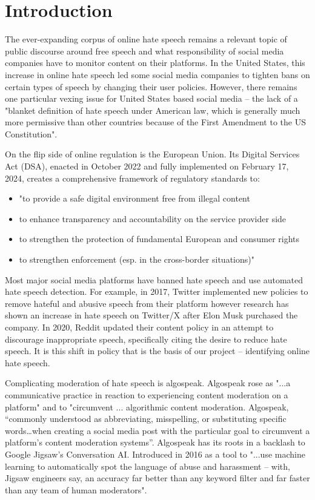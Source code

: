 \documentclass[conference]{IEEEtran}
\begin{document}
\section{Introduction}
The ever-expanding corpus of online hate speech remains a relevant topic of public discourse around free speech and what responsibility of social media companies have to monitor content on their platforms. In the United States, this increase in online hate speech led some social media companies to tighten bans on certain types of speech by changing their user policies. However, there remains one particular vexing issue for United States based social media -- the lack of a "blanket definition of hate speech under American law, which is generally much more permissive than other countries because of the First Amendment to the US Constitution"\cite{b1}. 

On the flip side of online regulation is the European Union. Its Digital Services Act (DSA), enacted in October 2022 and fully implemented on February 17, 2024, creates a comprehensive framework of regulatory standards to:
\begin{itemize}
    \item "to provide a safe digital environment free from illegal content
    \item to enhance transparency and accountability on the service provider side
    \item to strengthen the protection of fundamental European and consumer rights
    \item to strengthen enforcement (esp. in the cross-border situations)"\cite{b2}
\end{itemize}

Most major social media platforms have banned hate speech and use automated hate speech detection\cite{b3}. For example, in 2017, Twitter implemented new policies to remove hateful and abusive speech from their platform\cite{b4} however research has shown an increase in hate speech on Twitter/X after Elon Musk purchased the company\cite{b1}. In 2020, Reddit updated their content policy in an attempt to discourage inappropriate speech, specifically citing the desire to reduce hate speech.\cite{b5} It is this shift in policy that is the basis of our project -- identifying online hate speech. 

Complicating moderation of hate speech is algospeak. Algospeak rose as "...a communicative practice in reaction to experiencing content moderation on a platform" and to "circumvent ... algorithmic content moderation\cite{b6}. Algospeak, “commonly understood as abbreviating, misspelling, or substituting specific words…when creating a social media post with the particular goal to circumvent a platform’s content moderation systems”\cite{b6}. Algospeak has its roots in a backlash to Google Jigsaw's Conversation AI. Introduced in 2016 as a tool to "...use machine learning to automatically spot the language of abuse and harassment -- with, Jigsaw engineers say, an accuracy far better than any keyword filter and far faster than any team of human moderators"\cite{b7}. 
\end{document}
